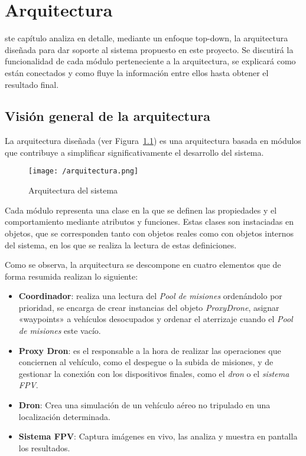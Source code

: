 \chapter{Arquitectura}
\label{chap:arquitectura}

ste capítulo analiza en detalle, mediante un enfoque top-down, la arquitectura diseñada para dar soporte al sistema propuesto en este proyecto. Se discutirá la funcionalidad de cada módulo perteneciente a la arquitectura, se explicará como están conectados y como fluye la información entre ellos hasta obtener el resultado final. 

\section{Visión general de la arquitectura}
\label{sec:visiongeneral}

La arquitectura diseñada (ver Figura~\ref{fig:arquitectura}) es una arquitectura basada en módulos que contribuye a simplificar significativamente el desarrollo del sistema.

\begin{figure}[!h]
\begin{center}
\texttt{[image: /arquitectura.png]}
\caption[Arquitectura del sistema]{Arquitectura del sistema}
\label{fig:arquitectura}
\end{center}
\end{figure}

Cada módulo representa una clase en la que se definen las propiedades y el comportamiento mediante atributos y funciones. Estas clases son instaciadas en objetos, que se corresponden tanto con objetos reales como con objetos internos del sistema, en los que se realiza la lectura de estas definiciones.

Como se observa, la arquitectura se descompone en cuatro elementos que de forma resumida realizan lo siguiente:
\begin{itemize}
\item \textbf{Coordinador}: realiza una lectura del \textit{Pool de misiones} ordenándolo por prioridad, se encarga de crear instancias del objeto \textit{ProxyDrone}, asignar «waypoints» a vehículos desocupados y ordenar el aterrizaje cuando el \textit{Pool de misiones} este vacío.
\item \textbf{Proxy Dron}: es el responsable a la hora de realizar las operaciones que conciernen al vehículo, como el despegue o la subida de misiones, y de gestionar la conexión con los dispositivos finales, como el \textit{dron} o el \textit{sistema \acs{FPV}}.
\item \textbf{Dron}: Crea una simulación de un vehículo aéreo no tripulado en una localización determinada.
\item \textbf{Sistema FPV}: Captura imágenes en vivo, las analiza y muestra en pantalla los resultados.
\end{itemize} 

